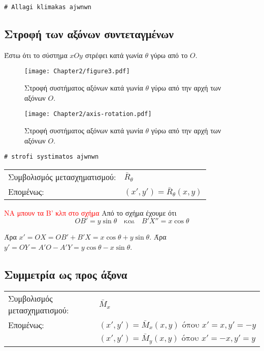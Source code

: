 \begin{lstlisting}
# Allagi klimakas ajwnwn
\end{lstlisting}



\subsection{Στροφή των αξόνων συντεταγμένων}
Έστω ότι το σύστημα $xOy$ στρέφει κατά γωνία $\theta$ γύρω από το $O$.

\begin{figure}[hbt]
  \begin{center}
	\texttt{[image: Chapter2/figure3.pdf]}
  \end{center}
  \caption{Στροφή συστήματος αξόνων κατά γωνία $\theta$ γύρω από την αρχή των αξόνων $O$.}
\end{figure}

\begin{figure}[h!]
  \begin{center}
	\texttt{[image: Chapter2/axis-rotation.pdf]}
  \end{center}
  \caption{Στροφή συστήματος αξόνων κατά γωνία $\theta$ γύρω από την αρχή των αξόνων $O$.}
\end{figure}


\begin{lstlisting}
# strofi systimatos ajwnwn
\end{lstlisting}

\begin{tabular}{m{}m{}}
	Συμβολισμός μετασχηματισμού: & $ \bar{R}_\theta $\\
	Επομένως: & $(x', y') = \bar{R}_\theta (x, y)$\\
\end{tabular}

\textcolor{red}{ΝΑ μπουν τα B' κλπ στο σχήμα}
Από το σχήμα έχουμε ότι 
\[
	OB' = y \sin\theta \quad \text{και} \quad B'X'' = x \cos\theta
\]

Άρα $x' = OX = OB' + B'X = x \cos\theta + y \sin\theta$.
Άρα $y' = OY = A'O - A'Y = y \cos\theta - x \sin\theta$.

\subsection{Συμμετρία ως προς άξονα}


\begin{tabular}{m{}m{}}
	Συμβολισμός μετασχηματισμού: & $ \bar{M}_x $\\
	Επομένως: & $(x',y') = \bar{M}_x(x,y) \text{ όπου } x' = x, y' = -y$\\
	& $(x',y') = \bar{M}_y(x,y) \text{ όπου } x' = -x, y' = y$
\end{tabular}


